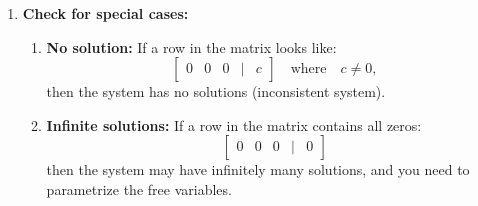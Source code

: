 \begin{process}
\begin{enumerate}
        \item \textbf{Check for special cases:}
        \begin{enumerate}
            \item \textbf{No solution:} If a row in the matrix looks like:
            \[
            \begin{bmatrix}
            0 & 0 & 0 & | & c
            \end{bmatrix}
            \quad \text{where} \quad c \neq 0,
            \]
            then the system has no solutions (inconsistent system).
            
            \item \textbf{Infinite solutions:} If a row in the matrix contains all zeros:
            \[
            \begin{bmatrix}
            0 & 0 & 0 & | & 0
            \end{bmatrix}
            \]
            then the system may have infinitely many solutions, and you need to parametrize the free variables.
        \end{enumerate}
    \end{enumerate}
    
    
\end{process}

